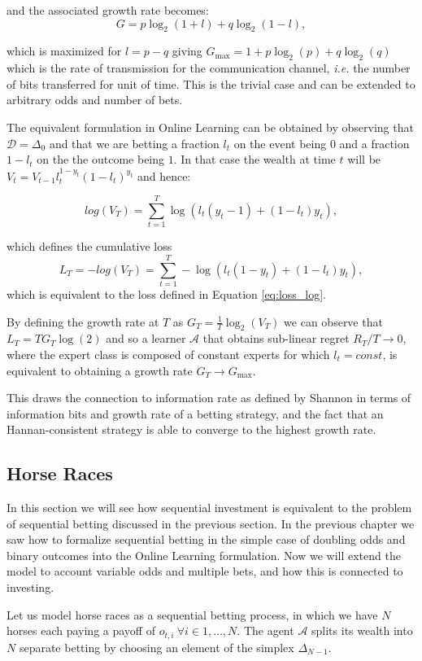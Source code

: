 and the associated growth rate becomes: 
$$G=p\log_2(1+l)+q\log_2(1-l),$$

which is maximized for $l=p-q$ giving $G_{\max}=1+p\log_2(p)+q\log_2(q)$ which is the rate of transmission for the communication channel, \emph{i.e.} the number of bits transferred for unit of time. This is the trivial case and can be extended to arbitrary odds and number of bets.

The equivalent formulation in Online Learning can be obtained by observing that $\mathcal D=\Delta_0$ and that we are betting a fraction $l_t$ on the event being $0$ and a fraction $1-l_t$ on the the outcome being $1$. In that case the wealth at time $t$ will be $V_t=V_{t-1}l_t^{1-y_t}(1-l_t)^{y_t}$ and hence: 

\begin{equation}
log(V_T)=\sum\limits_{t=1}^T\log(l_t(y_t-1)+(1-l_t)y_t),
\end{equation}

which defines the cumulative loss 
$$L_T=-log(V_T)=\sum\limits_{t=1}^T-\log(l_t(1-y_t)+(1-l_t)y_t),$$
which is equivalent to the loss defined in Equation \eqref{eq:loss_log}.

By defining the growth rate at $T$ as $G_T=\frac{1}{T}\log_2(V_T)$ we can observe that $L_T=TG_T\log(2)$ and so a learner $\mathcal A$ that obtains sub-linear regret $R_T/T\to0$, where the expert class is composed of constant experts for which $l_t=const$, is equivalent to obtaining a growth rate $G_T\to G_{\max}$.

This draws the connection to information rate as defined by Shannon in terms of information bits and growth rate of a betting strategy, and the fact that an Hannan-consistent strategy is able to converge to the highest growth rate. 

\subsection{Horse Races}

In this section we will see how sequential investment is equivalent to the problem of sequential betting discussed in the previous section.
In the previous chapter we saw how to formalize sequential betting in the simple case of doubling odds and binary outcomes into the Online Learning formulation. Now we will extend the model to account variable odds and multiple bets, and how this is connected to investing.

Let us model horse races as a sequential betting process, in which we have $N$ horses each paying a payoff of $o_{t,i}\ \forall i\in 1,\ldots,N$. The agent $\mathcal A$ splits its wealth into $N$ separate betting by choosing an element of the simplex $\Delta_{N-1}$.

